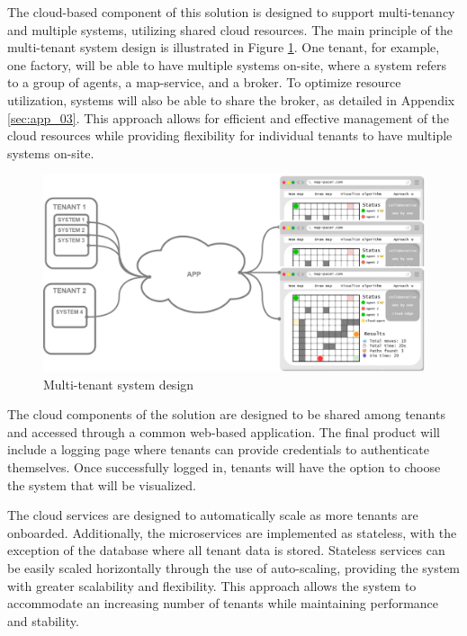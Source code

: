 The cloud-based component of this solution is designed to support multi-tenancy and multiple systems, utilizing shared cloud resources. The main principle of the multi-tenant system design is illustrated in Figure \ref{fig:multi_tenant_simple}. One tenant, for example, one factory, will be able to have multiple systems on-site, where a system refers to a group of agents, a map-service, and a broker. To optimize resource utilization, systems will also be able to share the broker, as detailed in Appendix \ref{sec:app_03}. This approach allows for efficient and effective management of the cloud resources while providing flexibility for individual tenants to have multiple systems on-site.

\begin{figure}[H]
    \centering
    \includegraphics[width=\textwidth]{pictures/multi_tenant_simple.png}
    \caption{ Multi-tenant system design }
    \label{fig:multi_tenant_simple}
\end{figure}

The cloud components of the solution are designed to be shared among tenants and accessed through a common web-based application. The final product will include a logging page where tenants can provide credentials to authenticate themselves. Once successfully logged in, tenants will have the option to choose the system that will be visualized.

The cloud services are designed to automatically scale as more tenants are onboarded. Additionally, the microservices are implemented as stateless, with the exception of the database where all tenant data is stored. Stateless services can be easily scaled horizontally through the use of auto-scaling, providing the system with greater scalability and flexibility. This approach allows the system to accommodate an increasing number of tenants while maintaining performance and stability.